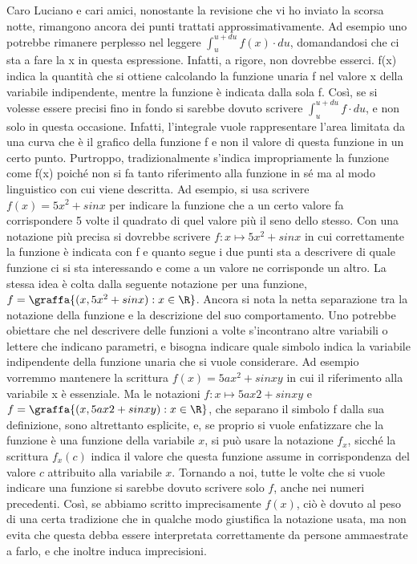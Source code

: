 Caro Luciano e cari amici,
       nonostante la revisione che vi ho inviato la scorsa notte, rimangono 
ancora dei punti trattati ap­prossimativamente. Ad esempio uno potrebbe 
rimanere perplesso nel leggere \(\int_u^{u+du} f(x) \cdot du\), 
doman­dandosi che ci sta a 
fare la x in questa espressione. Infatti, a rigore, non dovrebbe esserci. 
f(x) indica la quantità che si ottiene calcolando la funzione unaria f nel 
valore x della variabile indipendente, mentre la funzione è indicata dalla 
sola f. Così, se si volesse essere precisi fino in fondo si sarebbe dovuto 
scrivere \(\int_u^{u+du} f \cdot du\), e non solo in questa occasione. 
Infatti, l'integrale 
vuole rappresentare l'area limitata da una curva che è il grafico della 
funzione f e non il valore di questa funzione in un certo punto. Purtroppo, 
tradizionalmente s'indica impropriamente la funzione come f(x) poiché non si 
fa tanto riferimento alla funzione in sé ma al modo linguistico con cui viene 
descritta. Ad esempio, si usa scrivere \(f(x) = 5x^2+sin x\) per indicare la 
funzione che a un certo valore fa corrispondere 5 volte il quadrato di quel 
valore più il seno dello stesso. Con una notazione più precisa si dovrebbe 
scrivere \(f: x \mapsto 5x^2+sin x\) in cui correttamente la funzione è 
indicata con f 
e quanto segue i due punti sta a descrivere di quale funzione ci si sta 
interessando e come a un valore ne corrisponde un altro. La stessa idea è 
colta dalla seguente notazione per una funzione, 
\(f = \graffa{(x, 5x^2+sin x): x \in \R}\). 
Ancora si nota la netta separazione tra la notazione della funzione e la 
descrizione del suo comportamento. Uno potrebbe obiettare che nel descrivere 
delle funzioni a volte s'incontrano altre variabili o lettere che indicano 
parametri, e bisogna indicare quale simbolo indica la variabile indipendente 
della funzione unaria che si vuole considerare. Ad esempio vorremmo mantenere 
la scrittura \(f(x) = 5ax^2+sin xy\) in cui il riferimento alla variabile x è 
essenziale. Ma le notazioni 
\(f: x \mapsto 5ax2+sin xy\) e 
\(f=\graffa{(x, 5ax2+sin xy): x \in \R}\), 
che separano il simbolo f dalla sua definizione, sono altrettanto esplicite, 
e, se proprio si vuole enfatizzare che la funzione è una funzione della 
variabile \(x\), si può usare la notazione 
\(f_x\), sicché la scrittura \(f_x(c)\) 
indica il valore che questa funzione assume in corrispondenza del valore 
\(c\) attribuito alla variabile \(x\).
Tornando a noi, tutte le volte che si vuole indicare una funzione si sarebbe 
dovuto scrivere solo \(f\), anche nei numeri precedenti. Così, se abbiamo 
scritto 
imprecisamente \(f(x)\), ciò è dovuto al peso di una certa tradizione che in 
qualche modo giustifica la notazione usata, ma non evita che questa debba 
essere interpretata correttamente da persone ammaestrate a farlo, e che 
inoltre induca imprecisioni. 

